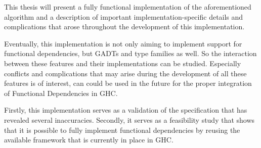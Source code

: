 This thesis will present a fully functional implementation of the aforementioned
algorithm and a description of important implementation-specific details and
complications that arose throughout the development of this implementation.

Eventually, this implementation is not only aiming to implement support for functional dependencies,
but GADTs and type families as well. So the interaction between these features
and their implementations can be studied. Especially conflicts and complications
that may arise during the development of all these features is of interest, can
could be used in the future for the proper integration of Functional
Dependencies in GHC.

Firstly, this implementation serves as a validation of the specification
that has revealed several inaccuracies. Secondly, it serves as a feasibility study
that shows that it is possible to fully implement functional dependencies by
reusing the available framework that is currently in place in GHC.
